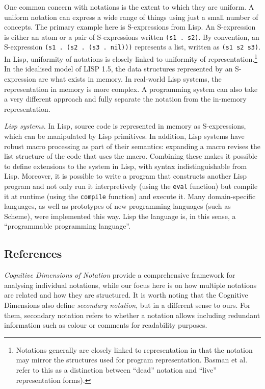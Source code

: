 \documentclass[ twoside,openright,titlepage,numbers=noenddot,headinclude,footinclude,cleardoublepage=empty,abstract=on,
                BCOR=5mm,paper=a4,fontsize=11pt
                ]{scrreprt}
\theoremstyle{definition}
\begin{document}
One common concern with notations is the extent to which they are
uniform. A uniform notation can express a wide range of things using
just a small number of concepts. The primary example here is
S-expressions from Lisp. An S-expression is either an atom or a pair of
S-expressions written \texttt{(s1\ .\ s2)}. By convention, an
S-expression \texttt{(s1\ .\ (s2\ .\ (s3\ .\ nil)))} represents a list,
written as \texttt{(s1\ s2\ s3)}. In Lisp, uniformity of notations is
closely linked to uniformity of representation.\footnote{Notations
  generally are closely linked to representation in that the notation
  may mirror the structures used for program representation. Basman et
  al.~\parencite{Externalize} refer to this as a distinction between
  ``dead'' notation and ``live'' representation forms).} In the
idealised model of LISP 1.5, the data structures represented by an
S-expression are what exists in memory. In real-world Lisp systems, the
representation in memory is more complex. A programming system can also
take a very different approach and fully separate the notation from the
in-memory representation.

\emph{Lisp systems.} In Lisp, source code is represented in memory as
S-expressions, which can be manipulated by Lisp primitives. In addition,
Lisp systems have robust macro processing as part of their semantics:
expanding a macro revises the list structure of the code that uses the
macro. Combining these makes it possible to define extensions to the
system in Lisp, with syntax indistinguishable from Lisp. Moreover, it is
possible to write a program that constructs another Lisp program and not
only run it interpretively (using the \texttt{eval} function) but
compile it at runtime (using the \texttt{compile} function) and execute
it. Many domain-specific languages, as well as prototypes of new
programming languages (such as Scheme), were implemented this way. Lisp
the language is, in this sense, a ``programmable programming language''.
\parencite{LispIntro,ProgProgLang}

\hypertarget{references}{\subsection{References}\label{references}}

\emph{Cognitive Dimensions of Notation} \parencite{CogDims} provide a
comprehensive framework for analysing individual notations, while our
focus here is on how multiple notations are related and how they are
structured. It is worth noting that the Cognitive Dimensions also define
\emph{secondary notation}, but in a different sense to ours. For them,
secondary notation refers to whether a notation allows including
redundant information such as colour or comments for readability
purposes.
\end{document}
